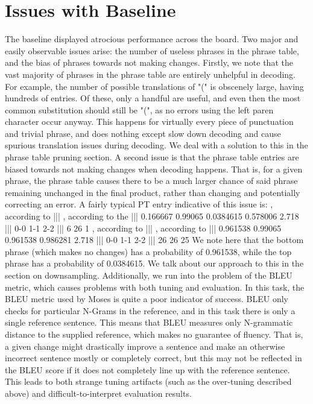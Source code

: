 \documentclass[11pt,letterpaper]{article}
\begin{document}
\section{Issues with Baseline}
\indent The baseline displayed atrocious performance across the board. Two major and easily observable 
issues arise: the number of useless phrases in the phrase table, and the bias of phrases towards not 
making changes. \newline
\indent Firstly, we note that the vast majority of phrases in the phrase table are entirely unhelpful 
in decoding. For example, the number of possible translations of "(" is obscenely large, having hundreds
of entries. Of these, only a handful are useful, and even then the most common substitution should still 
be "(", as no errors using the left paren character occur anyway. This happens for virtually every piece 
of punctuation and trivial phrase, and does nothing except slow down decoding and cause spurious translation 
issues during decoding. We deal with a solution to this in the phrase table pruning section. \newline
\indent A second issue is that the phrase table entries are biased towards not making changes when 
decoding happens. That is, for a given phrase, the phrase table causes there to be a much larger chance 
of said phrase remaining unchanged in the final product, rather than changing and potentially correcting 
an error. A fairly typical PT entry indicative of this issue is: \newline
\newline
\indent , according to ||| , according to the ||| 0.166667 0.99065 0.0384615 0.578006 2.718 ||| 0-0 1-1 2-2 ||| 6 26 1 \newline \newline
\indent , according to ||| , according to ||| 0.961538 0.99065 0.961538 0.986281 2.718 ||| 0-0 1-1 2-2 ||| 26 26 25 \newline \newline
\indent We note here that the bottom phrase (which makes no changes) has a probability of 
0.961538, while the top phrase has a probability of 0.0384615. We talk about our approach to this 
in the section on downsampling. \newline
\indent Additionally, we run into the problem of the BLEU metric, which causes problems with both 
tuning and evaluation. In this task, the BLEU metric used by Moses is quite a poor indicator 
of success. BLEU only checks for particular N-Grams in the reference, and in this task there is only a 
single reference sentence. This means that BLEU measures only N-grammatic distance to the supplied reference, 
which makes no guarantee of fluency. That is, a given change might drastically improve a sentence and make an 
otherwise incorrect sentence mostly or completely correct, but this may not be reflected in the BLEU score if 
it does not completely line up with the reference sentence. This leads to both strange tuning artifacts (such 
as the over-tuning described above) and difficult-to-interpret evaluation results. \newline
\end{document}
